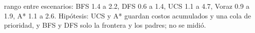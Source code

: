 {rango entre escenarios: BFS 1.4 a 2.2, DFS 0.6 a 1.4, UCS 1.1 a 4.7, Voraz 0.9 a 1.9, A* 1.1 a 2.6.}
{Hipótesis: UCS y A* guardan costos acumulados y una cola de prioridad, y BFS y DFS solo la frontera y los padres; no se midió.}
